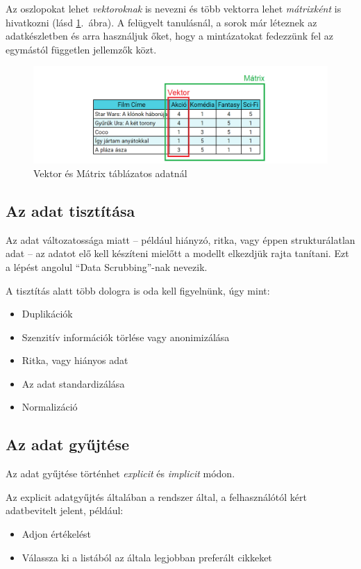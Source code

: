 \documentclass[
]{thesis-ekf}
\theoremstyle{definition}
\theoremstyle{remark}
\begin{document}
	Az oszlopokat lehet \emph{vektoroknak} is nevezni és több vektorra lehet \emph{mátrixként} is hivatkozni (lásd \ref{fig-vektor-matrix}.~ábra). A felügyelt tanulásnál, a sorok már léteznek az adatkészletben és arra használjuk őket, hogy a mintázatokat fedezzünk fel az egymástól független jellemzők közt.\cite{book:ml-for-beginners}
	\begin{figure}[!h]
		\centering
		\includegraphics[width=14cm]{images/vektor-matrix.png}
		\caption{Vektor és Mátrix táblázatos adatnál\cite{book:ml-for-beginners}}
		\label{fig-vektor-matrix}
	\end{figure}
	
	
\subsection{Az adat tisztítása}
Az adat változatossága miatt -- például hiányzó, ritka, vagy éppen strukturálatlan adat -- az adatot elő kell készíteni mielőtt a modellt elkezdjük rajta tanítani. Ezt a lépést angolul ``Data Scrubbing''-nak nevezik.

A tisztítás alatt több dologra is oda kell figyelnünk, úgy mint:
\begin{itemize}
	\item Duplikációk
	\item Szenzitív információk törlése vagy anonimizálása
	\item Ritka, vagy hiányos adat
	\item Az adat standardizálása
	\item Normalizáció
\end{itemize}

\subsection{Az adat gyűjtése}
Az adat gyűjtése történhet \emph{explicit} és \emph{implicit} módon.

Az explicit adatgyűjtés általában a rendszer által, a felhasználótól kért adatbevitelt jelent, például:
\begin{itemize}
	\item Adjon értékelést
	\item Válassza ki a listából az általa legjobban preferált cikkeket
\end{itemize}
\end{document}
